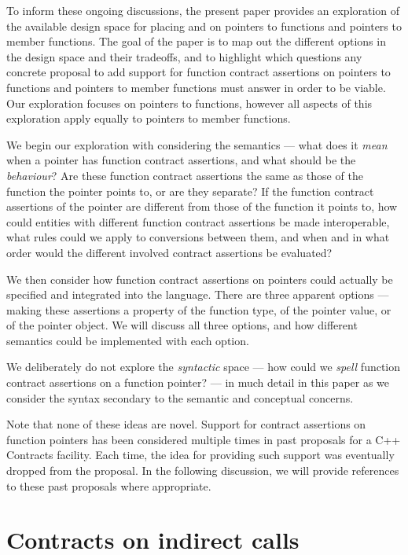 To inform these ongoing discussions, the present paper provides an exploration of the available design space for placing  and  on pointers to functions and pointers to member functions. The goal of the paper is to map out the different options in the design space and their tradeoffs, and to highlight which questions any concrete proposal to add support for function contract assertions on pointers to functions and pointers to member functions must answer in order to be viable. Our exploration focuses on pointers to functions, however all aspects of this exploration apply equally to pointers to member functions.

We begin our exploration with considering the semantics --- what does it \emph{mean} when a pointer has function contract assertions, and what should be the \emph{behaviour}? Are these function contract assertions the same as those of the function the pointer points to, or are they separate? If the function contract assertions of the pointer are different from those of the function it points to, how could entities with different function contract assertions be made interoperable, what rules could we apply to conversions between them, and when and in what order would the different involved contract assertions be evaluated?

We then consider how function contract assertions on pointers could actually be specified and  integrated into the language. There are three apparent options --- making these assertions a property of the function type, of the pointer value, or of the pointer object. We will discuss all three options, and how different semantics could be implemented with each option.

We deliberately do not explore the \emph{syntactic} space --- how could we \emph{spell} function contract assertions on a function pointer? --- in much detail in this paper as we consider the syntax secondary to the semantic and conceptual concerns. 

Note that none of these ideas are novel. Support for contract assertions on function pointers has been considered multiple times in past proposals for a C++ Contracts facility. Each time, the idea for providing such support was eventually dropped from the proposal. In the following discussion, we will provide references to these past proposals where appropriate.

\section{Contracts on indirect calls}

